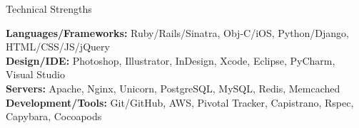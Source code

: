 \documentclass{resume} %
\begin{document}

\begin{rSection}{Technical Strengths}

\textbf{Languages/Frameworks:} Ruby/Rails/Sinatra, Obj-C/iOS, Python/Django, HTML/CSS/JS/jQuery \\
\textbf{Design/IDE:} Photoshop, Illustrator, InDesign, Xcode, Eclipse, PyCharm, Visual Studio  \\
\textbf{Servers:} Apache, Nginx, Unicorn, PostgreSQL, MySQL, Redis, Memcached  \\
\textbf{Development/Tools:} Git/GitHub, AWS, Pivotal Tracker, Capistrano, Rspec, Capybara, Cocoapods \\

\end{rSection}

\end{document}
